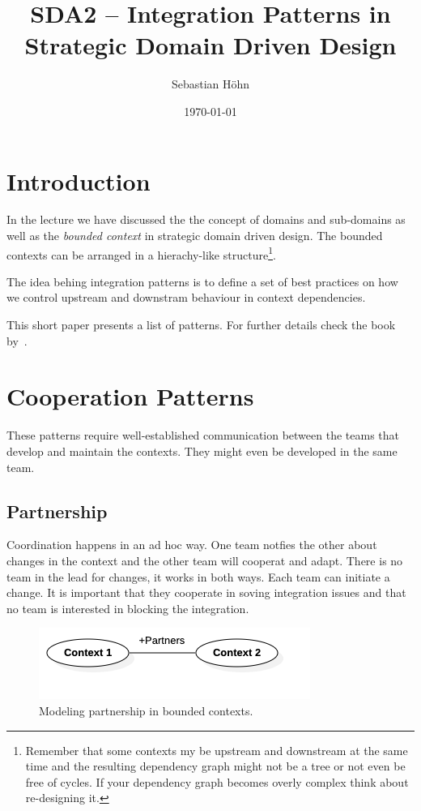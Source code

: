 \documentclass{tufte-handout}
\title[SDA2 -- Integration in Strategic DDD]{SDA2 -- Integration Patterns in Strategic Domain Driven Design}
\author{Sebastian Höhn}
\date{\today}
\begin{document}
\maketitle
\logos

\section{Introduction}
In the lecture we have discussed the the concept of domains and sub-domains
as well as the \textit{bounded context} in strategic domain driven design. 
The bounded contexts can be arranged in a hierachy-like structure\footnote{Remember that
some contexts my be upstream and downstream at the same time and the resulting
dependency graph might not be a tree or not even be free of cycles. If your dependency graph
becomes overly complex think about re-designing it.}. 

The idea behing integration patterns is to define a set of best practices on how we
control upstream and downstram behaviour in context dependencies.

This short paper presents a list of patterns. For further details check the book 
by~\citet{Khononov2022}.

\section{Cooperation Patterns}

These patterns require well-established communication between the teams that
develop and maintain the contexts. They might even be developed in the same team.

\subsection{Partnership}

Coordination happens in an ad hoc way. One team notfies the other about changes in 
the context and the other team will cooperat and adapt. There is no team in the lead
for changes, it works in both ways. Each team can initiate a change. It is important 
that they cooperate in soving integration issues and that no team is interested in
blocking the integration.

\begin{figure}
    \includegraphics[width=.8\textwidth]{img/integrating_context_partners.png}
    \caption{Modeling partnership in bounded contexts.}
\end{figure}
\end{document}
